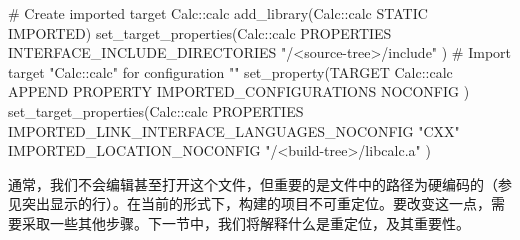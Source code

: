 
\begin{cmake}
# Create imported target Calc::calc
add_library(Calc::calc STATIC IMPORTED)
set_target_properties(Calc::calc PROPERTIES
    INTERFACE_INCLUDE_DIRECTORIES
    "/<source-tree>/include"
)
# Import target "Calc::calc" for configuration ""
set_property(TARGET Calc::calc APPEND PROPERTY
    IMPORTED_CONFIGURATIONS NOCONFIG
)
set_target_properties(Calc::calc PROPERTIES
    IMPORTED_LINK_INTERFACE_LANGUAGES_NOCONFIG "CXX"
    IMPORTED_LOCATION_NOCONFIG "/<build-tree>/libcalc.a"
)
\end{cmake}

通常，我们不会编辑甚至打开这个文件，但重要的是文件中的路径为硬编码的（参见突出显示的行）。在当前的形式下，构建的项目不可重定位。要改变这一点，需要采取一些其他步骤。下一节中，我们将解释什么是重定位，及其重要性。












































































